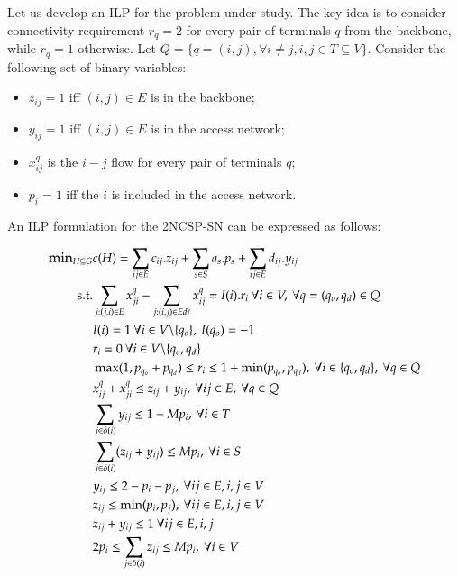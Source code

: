 \documentclass{endm}
\begin{document}
\subsection{}
\subsection{}
 


Let us develop an ILP for the problem under study. The key idea is to consider connectivity requirement $r_q=2$ for every pair of terminals $q$ from the backbone, while $r_q=1$ otherwise.
Let $Q=\{q=(i,j),\forall i\neq j, i,j \in T\subseteq V\}$. Consider the following set of binary variables:
\begin{itemize}
\item  $z_{ij}=1$ iff $(i,j)\in E$ is in the backbone;
\item $y_{ij}=1$ iff $(i,j)\in E$ is in the access network;
\item $x_{ij}^{q}$ is the $i-j$ flow for every pair of terminals $q$;
\item $p_{i}=1$ iff the $i$ is included in the access network.
\end{itemize}

An ILP formulation for the 2NCSP-SN can be expressed as follows:

\setcounter{equation}{0}
\begin{align}
\small
\mbox{min}_{H \subseteq G} &c(H)= \sum _{ij\in E} c_{ij}.z_{ij}+ \sum _{s\in S} a_{s}.p_{s}+ \sum _{ij\in E} d_{ij}.y_{ij}\label{ecu0} \\
\mbox{s.t.} &\sum _{j:(j,i)\in E} x_{ji}^{q}-\sum _{j:(i,j)\in Ed^{q}} x_{ij}^{q} =  I(i).r_{i}\: \forall i \in V,\:\forall q=(q_{o},q_{d})\in Q \label{ecu1}\\
& I(i)=1 \:\forall i \in V \backslash \{q_{o}\},\:I(q_{o})=-1 \label{ecu2}\\
& r_{i}= 0 \:\forall i \in V \backslash \{q_{o},q_{d}\} \label{ecu3}\\
& \max(1,p_{q_{o}}+p_{q_{d}}) \leq r_{i}\leq 1+ \min(p_{q_{o}},p_{q_{d}}),\:\forall  i \in \{q_{o},q_{d}\},\:\forall q\in Q\label{ecu4}\\
& x_{ij}^{q}+x_{ji}^{q} \leq z_{ij}+y_{ij},  \:\forall ij\in E,\:\forall q \in Q \label{ecu5}\\
& \sum_{j \in \delta (i)} y_{ij} \leq  1+ M p_{i}, \:\forall  i\in T \label{ecu6}\\
&\sum _{j\in \delta (i)} (z_{ij}+y_{ij}) \leq  M p_{i}, \:\forall  i\in S \label{ecu7}\\
& y_{ij} \leq 2-p_{i}-p_{j}, \: \forall ij\in E, i,j \in V\label{ecu8}\\
& z_{ij} \leq \min(p_{i},p_{j}), \: \forall ij\in E, i,j \in V\label{ecu9}\\
& z_{ij}+y_{ij} \leq 1 \: \forall ij\in E, i,j \label{ecu10}\\
& 2p_{i} \leq \sum_{j\in \delta (i)}z_{ij}\leq Mp_{i}, \: \forall i \in V\label{ecu11}
\end{align}
\end{document}
